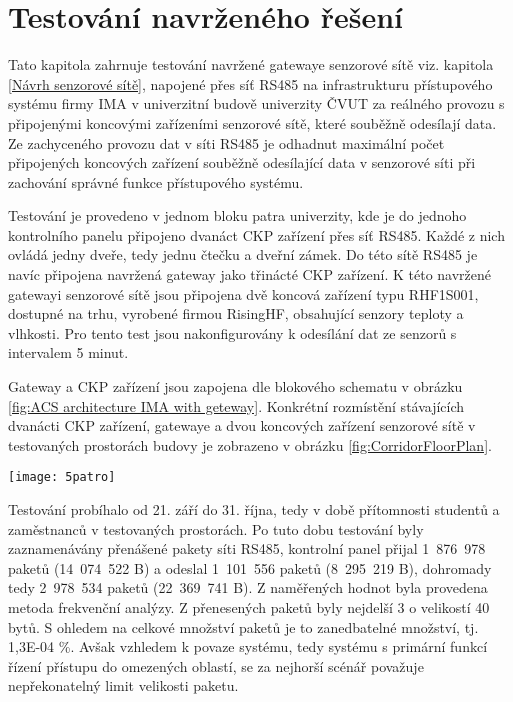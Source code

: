 \chapter{Testování navrženého řešení}
\label{Testování navrženého řešení}
Tato kapitola zahrnuje testování navržené gatewaye senzorové sítě viz. kapitola \ref{Návrh senzorové sítě}, napojené přes síť RS485 na infrastrukturu přístupového systému firmy IMA v univerzitní budově univerzity ČVUT za reálného provozu s připojenými koncovými zařízeními senzorové sítě, které souběžně odesílají data. Ze zachyceného provozu dat v síti RS485 je odhadnut maximální počet připojených koncových zařízení souběžně odesílající data v senzorové síti při zachování správné funkce přístupového systému.

Testování je provedeno v jednom bloku patra univerzity, kde je do jednoho kontrolního panelu připojeno dvanáct CKP zařízení přes síť RS485. Každé z nich ovládá jedny dveře, tedy jednu čtečku a dveřní zámek.
Do této sítě RS485 je navíc připojena navržená gateway jako třinácté CKP zařízení.
K této navržené gatewayi senzorové sítě jsou připojena dvě koncová zařízení typu RHF1S001, dostupné na trhu, vyrobené firmou RisingHF, obsahující senzory teploty a vlhkosti. Pro tento test jsou nakonfigurovány k odesílání dat ze senzorů s intervalem 5 minut.

Gateway a CKP zařízení jsou zapojena dle blokového schematu v obrázku \ref{fig:ACS architecture IMA with geteway}.
Konkrétní rozmístění stávajících dvanácti CKP zařízení, gatewaye a dvou koncových zařízení senzorové sítě v testovaných prostorách budovy je zobrazeno v obrázku \ref{fig:CorridorFloorPlan}.

\begin{figure*}[!ht]
    \centering
    \texttt{[image: 5patro]}
    \caption{Rozmístění koncových zařízení sítě a zařízení CKP v testovaných prostorách budovy}
    \label{fig:CorridorFloorPlan}
\end{figure*}

Testování probíhalo od 21. září do 31. října, tedy v době přítomnosti studentů a zaměstnanců v testovaných prostorách. 
Po tuto dobu testování byly zaznamenávány přenášené pakety síti RS485, kontrolní panel přijal 1~876~978 paketů (14~074~522 B) a odeslal 1~101~556 paketů (8~295~219 B), dohromady tedy 2~978~534 paketů (22~369~741 B).
Z naměřených hodnot byla provedena metoda frekvenční analýzy. Z přenesených paketů byly nejdelší 3 o velikostí 40 bytů.
S ohledem na celkové množství paketů je to zanedbatelné množství, tj. 1,3E-04 \%.
Avšak vzhledem k povaze systému, tedy systému s primární funkcí řízení přístupu do omezených oblastí, se za nejhorší scénář považuje nepřekonatelný limit velikosti paketu.


